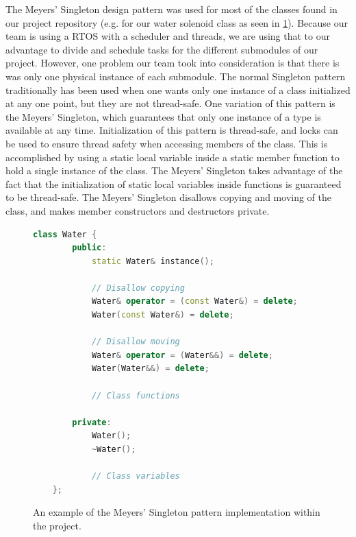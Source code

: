 \documentclass[journal]{IEEEtran}
\begin{document}
The Meyers' Singleton design pattern was used for most of the classes found in our project repository (e.g. for our water solenoid class as seen in \ref{fig:singleton_implementation}). Because our team is using a RTOS with a scheduler and threads, we are using that to our advantage to divide and schedule tasks for the different submodules of our project. However, one problem our team took into consideration is that there is was only one physical instance of each submodule. The normal Singleton pattern traditionally has been used when one wants only one instance of a class initialized at any one point, but they are not thread-safe. One variation of this pattern is the Meyers' Singleton, which guarantees that only one instance of a type is available at any time. Initialization of this pattern is thread-safe, and locks can be used to ensure thread safety when accessing members of the class. This is accomplished by using a static local variable inside a static member function to hold a single instance of the class. The Meyers' Singleton takes advantage of the fact that the initialization of static local variables inside functions is guaranteed to be thread-safe. The Meyers' Singleton disallows copying and moving of the class, and makes member constructors and destructors private\cite{Meyers}.

\lstset{style=mystyle}

\begin{figure}
	\centering
	\label{fig:singleton_implementation}

	\begin{lstlisting}[language=C++]
    class Water { 
        public:
            static Water& instance();

            // Disallow copying
            Water& operator = (const Water&) = delete;
            Water(const Water&) = delete;

            // Disallow moving
            Water& operator = (Water&&) = delete;
            Water(Water&&) = delete;

            // Class functions
        
        private:
            Water();
            ~Water();

            // Class variables
    };
\end{lstlisting}
	\caption{An example of the Meyers' Singleton pattern implementation within the project.}
\end{figure}
\end{document}
